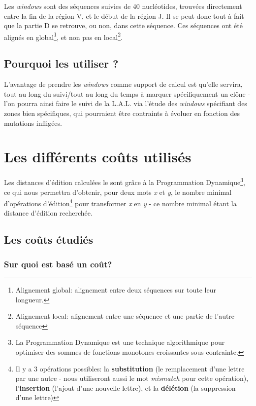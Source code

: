 \documentclass[12pt]{report}
\begin{document}
\begin{spacing}{1.2}
Les \textit{windows} sont des séquences suivies de 40 nucléotides, trouvées directement entre la fin de la région V, et le début de la région J. Il se peut donc tout à fait que la partie D se retrouve, ou non, dans cette séquence.
\newline
Ces séquences ont été alignés en global\footnote{Alignement global: alignement entre deux séquences sur toute leur longueur.}, et non pas en local\footnote{Alignement local: alignement entre une séquence et une partie de l'autre séquence}.

\subsection{Pourquoi les utiliser ?}

L'avantage de prendre les \textit{windows} comme support de calcul est qu'elle servira, tout au long du suivi/tout au long du temps à marquer spécifiquement un clône - l'on pourra ainsi faire le suivi de la L.A.L. via l'étude des \textit{windows} spécifiant des zones bien spécifiques, qui pourraient être contraints à évoluer en fonction des mutations infligées.

\section{Les différents coûts utilisés}

Les distances d'édition calculées le sont grâce à la Programmation Dynamique\footnote{La Programmation Dynamique est une technique algorithmique pour optimiser des sommes de fonctions monotones croissantes sous contrainte.}, ce qui nous permettra d'obtenir, pour deux mots \textit{x} et \textit{y}, le nombre minimal d’opérations d’édition\footnote{Il y a 3 opérations possibles: la \textbf{substitution} (le remplacement d'une lettre par une autre - nous utiliseront aussi le mot \textit{mismatch} pour cette opération), l'\textbf{insertion} (l'ajout d'une nouvelle lettre), et la \textbf{délétion} (la suppression d'une lettre)} pour transformer \textit{x} en \textit{y} - ce nombre minimal étant la distance d'édition recherchée.

\subsection{Les coûts étudiés}

\subsubsection{Sur quoi est basé un coût?}


\end{spacing}
\end{document}
